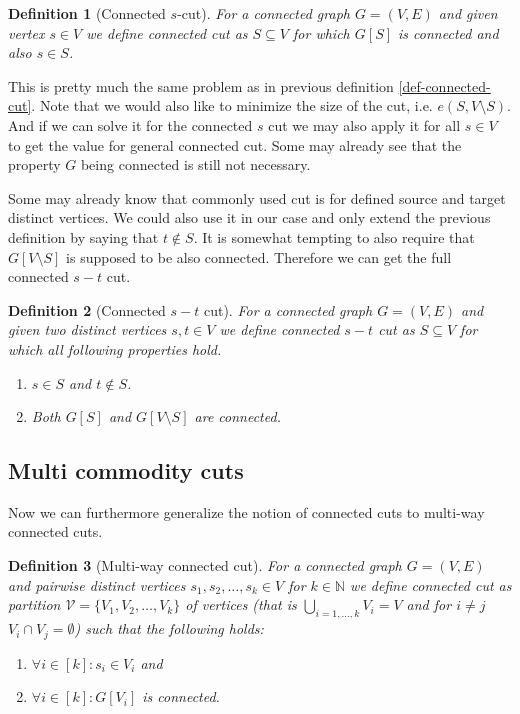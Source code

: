 \documentclass{article}
\theoremstyle{plain}
\theoremstyle{plain}
\newtheorem{defn}{Definition}
\theoremstyle{remark}
\begin{document}
	\begin{defn}[Connected $s$-cut]
		For a connected graph $G = (V,E)$ and given vertex $s \in V$ we define connected cut as $S \subseteq V$ for which $G[S]$ is connected and also $s \in S$.
		\label{def-connected-s-cut}
	\end{defn}

	This is pretty much the same problem as in previous definition \ref{def-connected-cut}. Note that we would also like to minimize the size of the cut, i.e. $e(S, V \setminus S)$. And if we can solve it for the connected $s$ cut we may also apply it for all $s \in V$ to get the value for general connected cut. Some may already see that the property $G$ being connected is still not necessary.
	
	Some may already know that commonly used cut is for defined source and target distinct vertices. We could also use it in our case and only extend the previous definition by saying that $t \notin S$. It is somewhat tempting to also require that $G[V \setminus S]$ is supposed to be also connected. Therefore we can get the full connected $s-t$ cut.
	
	\begin{defn}[Connected $s-t$ cut]
		For a connected graph $G = (V,E)$ and given two distinct vertices $s, t \in V$ we define connected $s-t$ cut as $S \subseteq V$ for which all following properties hold.
		
		\begin{enumerate}
			\item $s \in S$ and $t \notin S$.
			\item Both $G[S]$ and $G[V \setminus S]$ are connected.
		\end{enumerate}
		\label{def-connected-s-t-cut}
	\end{defn}

	\subsection{Multi commodity cuts}

	Now we can furthermore generalize the notion of connected cuts to multi-way connected cuts.
	
	\begin{defn}[Multi-way connected cut]
		For a connected graph $G = (V,E)$ and pairwise distinct vertices $s_1, s_2, \dots, s_k \in V$ for $k \in \mathbb{N}$ we define connected cut as partition $\mathcal{V} = \{V_1, V_2, \dots, V_k\}$ of vertices (that is $\bigcup_{i = 1, \dots, k} V_i = V$ and for $i \neq j$ $V_i \cap V_j = \emptyset$) such that the following holds:
		
		\begin{enumerate}
			\item $\forall i \in [k]: s_i \in V_i$ and
			\item $\forall i \in [k]: G[V_i]$ is connected.
		\end{enumerate}
	\end{defn}
	
\end{document}
